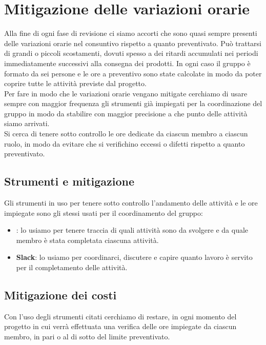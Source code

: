 \newpage

\section{Mitigazione delle variazioni orarie}	\label{mitigazione variazioni}
Alla fine di ogni fase di revisione ci siamo accorti che sono quasi sempre presenti delle variazioni orarie nel consuntivo rispetto a quanto preventivato.
Può trattarsi di grandi o piccoli scostamenti, dovuti spesso a dei ritardi accumulati nei periodi immediatamente successivi alla consegna dei prodotti. In ogni caso il gruppo è formato da sei persone e le ore a preventivo sono state calcolate in modo da poter coprire tutte le attività previste dal progetto.\\
Per fare in modo che le variazioni orarie vengano mitigate cerchiamo di usare sempre con maggior frequenza gli strumenti già impiegati per la coordinazione del gruppo in modo da stabilire con maggior precisione a che punto delle attività siamo arrivati.\\
Si cerca di tenere sotto controllo le ore dedicate da ciascun membro a ciascun ruolo, in modo da evitare che si verifichino eccessi o difetti rispetto a quanto preventivato.

    \subsection{Strumenti e mitigazione}
	Gli strumenti in uso per tenere sotto controllo l'andamento delle attività e le ore impiegate sono gli stessi usati per il coordinamento del gruppo:
	\begin{itemize}
	    \item \textbf{}: lo usiamo per tenere traccia di quali attività sono da svolgere e da quale membro è stata completata ciascuna attività.
	    \item \textbf{Slack}: lo usiamo per coordinarci, discutere e capire quanto lavoro è servito per il completamento delle attività.
	\end{itemize}
	
	\subsection{Mitigazione dei costi}\label{mitigazione_costi}
	Con l'uso degli strumenti citati cerchiamo di restare, in ogni momento del progetto in cui verrà effettuata una verifica delle ore impiegate da ciascun membro, in pari o al di sotto del limite preventivato.

